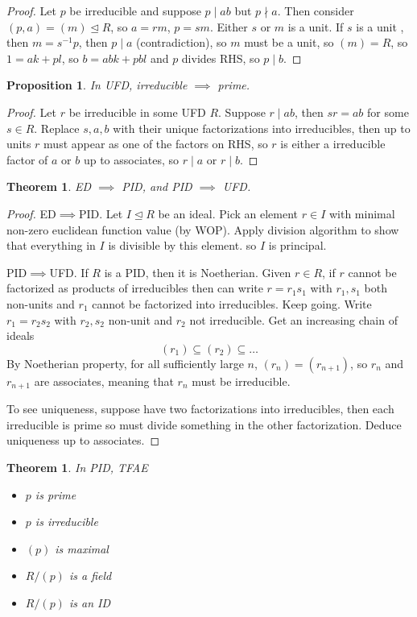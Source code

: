 \documentclass{article}
\theoremstyle{definition}
\theoremstyle{remark}
\theoremstyle{plain}
\newtheorem{thm}[defn]{Theorem}
\newtheorem{prop}[defn]{Proposition}
\theoremstyle{definition}
\begin{document}
\begin{proof}
    Let $p$ be irreducible and suppose $p\mid ab$ but $p\nmid a$. Then consider $(p,a)=(m)\trianglelefteq R$, so $a=rm$, $p=sm$. Either $s$ or $m$ is a unit. If $s$ is a unit , then $m=s^{-1}p$, then $p\mid a$ (contradiction), so $m$ must be a unit, so $(m)=R$, so $1=ak+pl$, so $b=abk+pbl$ and $p$ divides RHS, so $p\mid b$.
\end{proof}
\begin{prop}
    In UFD, irreducible $\implies$ prime.
\end{prop}
\begin{proof}
    Let $r$ be irreducible in some UFD $R$. Suppose $r\mid ab$, then $sr=ab$ for some $s\in R$. Replace $s,a,b$ with their unique factorizations into irreducibles, then up to units $r$ must appear as one of the factors on RHS, so $r$ is either a irreducible factor of $a$ or $b$ up to associates, so $r\mid a$ or $r\mid b$.
\end{proof}
\begin{thm}
    ED $\implies$ PID, and PID $\implies$ UFD.
\end{thm}
\begin{proof}
    ED$\implies$PID. Let $I\trianglelefteq R$ be an ideal. Pick an element $r\in I$ with minimal non-zero euclidean function value (by WOP). Apply division algorithm to show that everything in $I$ is divisible by this element. so $I$ is principal.

    PID$\implies$UFD. If $R$ is a PID, then it is Noetherian. Given $r\in R$, if $r$ cannot be factorized as products of irreducibles then can write $r=r_1s_1$ with $r_1, s_1$ both non-units and $r_1$ cannot be factorized into irreducibles. Keep going. Write $r_1=r_2s_2$ with $r_2, s_2$ non-unit and $r_2$ not irreducible. Get an increasing chain of ideals
    \[(r_1)\subseteq (r_2)\subseteq\ldots\]
    By Noetherian property, for all sufficiently large $n$, $(r_n)=(r_{n+1})$, so $r_n$ and $r_{n+1}$ are associates, meaning that $r_n$ must be irreducible.

    To see uniqueness, suppose have two factorizations into irreducibles, then each irreducible is prime so must divide something in the other factorization. Deduce uniqueness up to associates.
\end{proof}
\begin{thm}
    In PID, TFAE
    \begin{itemize}
        \item $p$ is prime
        \item $p$ is irreducible
        \item $(p)$ is maximal
        \item $R/(p)$ is a field
        \item $R/(p)$ is an ID
    \end{itemize}
\end{thm}
\end{document}
